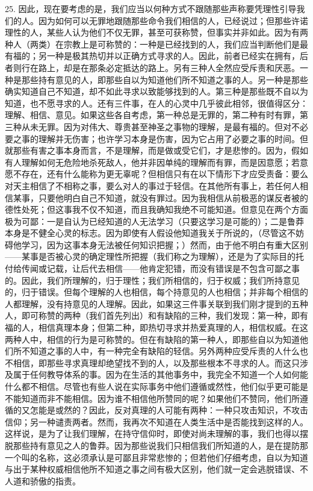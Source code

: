 25. 因此，现在要考虑的是，我们应当以何种方式不跟随那些声称要凭理性引导我们的人。因为如何可以无罪地跟随那些命令我们相信的人，已经说过；但那些许诺理性的人，某些人认为他们不仅无罪，甚至可获称赞，但事实并非如此。因为有两种人（两类）在宗教上是可称赞的：一种是已经找到的人，我们应当判断他们是最有福的；另一种是极其热切并以正确方式寻求的人。因此，前者已经实在拥有，后者则行在路上，却是在那条必定抵达的路上。另有三种人全然应受斥责和厌恶。一种是那些持有意见的人，即那些自以为知道他们所不知道之事的人。另一种是那些确实知道自己不知道，却不如此寻求以致能够找到的人。第三种是那些既不自以为知道，也不愿寻求的人。还有三件事，在人的心灵中几乎彼此相邻，很值得区分：理解、相信、意见。如果这些各自考虑，第一种总是无罪的，第二种有时有罪，第三种从未无罪。因为对伟大、尊贵甚至神圣之事物的理解，是最有福的。但对不必要之事的理解并无伤害；也许学习本身是伤害，因为它占用了必要之事的时间。但就那些有害之事本身而言，不是理解，而是做或受它们，才是悲惨的。因为，假如有人理解如何无危险地杀死敌人，他并非因单纯的理解而有罪，而是因意愿；若意愿不存在，还有什么能称为更无辜呢？但相信只有在以下情形下才应受责备：要么对天主相信了不相称之事，要么对人的事过于轻信。在其他所有事上，若任何人相信某事，只要他明白自己不知道，就没有罪过。因为我相信从前极恶的谋反者被的德性处死；但这事我不仅不知道，而且我确知我绝不可能知道。但意见在两个方面极为可鄙：一是自认为已经知道的人无法学习（只要这学习是可能的）；二是鲁莽本身是不健全心灵的标志。因为即使有人假设他知道我关于所说的，（尽管这不妨碍他学习，因为这事本身无法被任何知识把握；）然而，由于他不明白有重大区别——某事是否被心灵的确定理性所把握（我们称之为理解），还是为了实际目的托付给传闻或记载，让后代去相信——他肯定犯错，而没有错误是不包含可鄙之事的。因此，我们所理解的，归于理性；我们所相信的，归于权威；我们所持意见的，归于错误。但每个理解的人也相信，每个持意见的人也相信；并非每个相信的人都理解，没有持意见的人理解。因此，如果这三件事关联到我们刚才提到的五种人，即可称赞的两种（我们首先列出）和有缺陷的三种，我们发现：第一种，即有福的人，相信真理本身；但第二种，即热切寻求并热爱真理的人，相信权威。在这两种人中，相信的行为是可称赞的。但在有缺陷的第一种人，即那些自以为知道他们所不知道之事的人中，有一种完全有缺陷的轻信。另外两种应受斥责的人什么也不相信，即那些寻求真理却绝望找不到的人，以及那些根本不寻求的人。而这只涉及属于任何教导体系的事。因为在生活的其他事务中，我完全不知道一个人如何能什么都不相信。尽管也有些人说在实际事务中他们遵循或然性，他们似乎更可能是不能知道而非不能相信。因为谁不相信他所赞同的呢？如果他们不赞同，他们所遵循的又怎能是或然的？因此，反对真理的人可能有两种：一种只攻击知识，不攻击信仰；另一种谴责两者。然而，我再次不知道在人类生活中是否能找到这样的人。这样说，是为了让我们理解，在持守信仰时，即使对尚未理解的事，我们也得以摆脱那些持有意见之人的鲁莽。因为那些说我们只相信我们所知道的人，是在提防那一个叫的名称，这必须承认是可鄙且非常悲惨的；但若他们仔细考虑，自以为知道与出于某种权威相信他所不知道之事之间有极大区别，他们就一定会逃脱错误、不人道和骄傲的指责。\par

